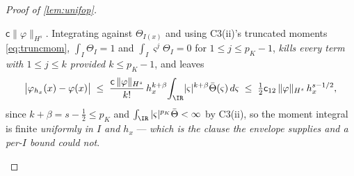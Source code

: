 \begin{proof}[Proof of \cref{lem:unifop}]
\begin{itemize}
$\mathsf c\|\varphi\|_{H^{s}}$. Integrating against $\Theta_{I(x)}$ and using C3(ii)'s truncated
moments \eqref{eq:truncmom}, $\int_{I}\Theta_{I}=1$ and $\int_{I}\varsigma^{j}\Theta_{I}=0$ for
$1\le j\le p_K-1$, \emph{kills every term with $1\le j\le k$ provided $k\le p_K-1$}, and leaves
\[
\big|\varphi_{h_x}(x)-\varphi(x)\big|
\;\le\;\frac{\mathsf c\,\|\varphi\|_{H^{s}}}{k!}\,h_x^{k+\beta}\!\int_{\IR}\!|\varsigma|^{k+\beta}\bar\Theta(\varsigma)\,d\varsigma
\;\le\;\tfrac12\mathsf c_{12}\,\|\varphi\|_{H^{s}}\,h_x^{s-1/2} ,
\]
since $k+\beta=s-\tfrac12\le p_K$ and $\int_\IR|\varsigma|^{p_K}\bar\Theta<\infty$ by C3(ii), so the
moment integral is finite \emph{uniformly in $I$ and $h_x$} --- \emph{which is the clause the envelope
supplies and a per-$I$ bound could not}.

\end{itemize}
\end{proof}
